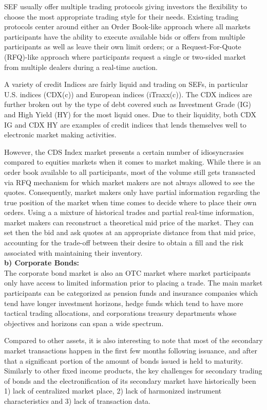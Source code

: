 SEF usually offer multiple trading protocols giving investors the flexibility to choose the most appropriate trading style for their needs. Existing trading protocols center around either an Order Book-like approach where all markets participants have the ability to execute available bids or offers from multiple participants as well as leave their own limit orders; or a Request-For-Quote (RFQ)-like approach where participants request a single or two-sided market from multiple dealers during a real-time auction.


A variety of credit Indices are fairly liquid and trading on SEFs, in particular U.S. indices (CDX(c)) and European indices (iTraxx(c)). The CDX indices are further broken out by the type of debt covered such as Investment Grade (IG) and High Yield (HY) for the most liquid ones. Due to their liquidity, both CDX IG and CDX HY are examples of credit indices that lends themselves well to electronic market making activities.


However, the CDS Index market presents a certain number of idiosyncrasies compared to equities markets when it comes to market making. While there is an order book available to all participants, most of the volume still gets transacted via RFQ mechanism for which market makers are not always allowed to see the quotes. Consequently, market makers only have partial information regarding the true position of the market when time comes to decide where to place their own orders. Using a a mixture of historical trades and partial real-time information, market makers can reconstruct a theoretical mid price of the market. They can set then the bid and ask quotes at an appropriate distance from that mid price, accounting for the trade-off between their desire to obtain a fill and the risk associated with maintaining their inventory. \\

\noindent\textbf{b) Corporate Bonds:} \\

The corporate bond market is also an OTC market where market participants only have access to limited information prior to placing a trade. The main market participants can be categorized as pension funds and insurance companies which tend have longer investment horizons, hedge funds which tend to have more tactical trading allocations, and corporations treasury departments whose objectives and horizons can span a wide spectrum.


Compared to other assets, it is also interesting to note that most of the secondary market transactions happen in the first few months following issuance, and after that a significant portion of the amount of bonds issued is held to maturity. Similarly to other fixed income products, the key challenges for secondary trading of bonds and the electronification of its secondary market have historically been 1) lack of centralized market place, 2) lack of harmonized instrument characteristics and 3) lack of transaction data.


